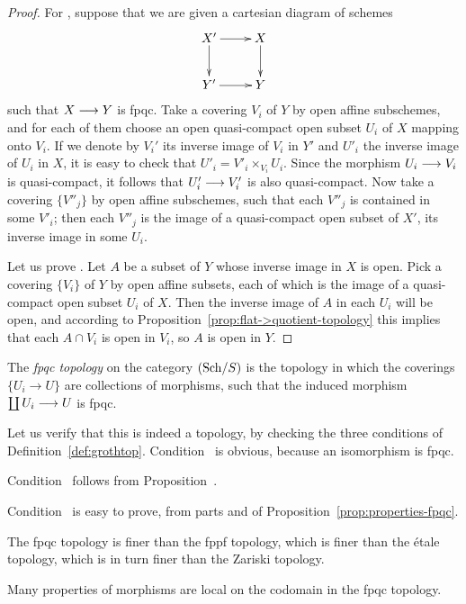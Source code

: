 \begin{2   CONTRAVARIANT FUNCTORS}
\begin{2.3 Sheaves in Grothendieck topologies}
\begin{proof}
For , suppose that we are given a cartesian diagram of schemes
   \[
   \xymatrix{
   X' \ar[r]\ar[d] & X \ar[d] \\
   Y' \ar[r] & Y
   }
   \]
such that $X \arr Y$ is fpqc. Take a covering $V_i$ of $Y$ by open affine subschemes, and for each of them choose an open quasi-compact open subset $U_i$ of $X$ mapping onto $V_i$. If we denote by $V_i'$ its inverse image of $V_i$ in $Y'$ and $U'_i$ the inverse image of $U_i$ in $X$, it is easy to check that $U'_i = V'_i \times_{V_i} U_i$. Since the morphism $U_i \arr V_i$ is quasi-compact, it follows that $U'_i \arr V'_i$ is also quasi-compact. Now take a covering $\{V''_j\}$ by open affine subschemes, such that each $V''_j$ is contained in some $V'_i$; then each $V''_j$ is the image of a quasi-compact open subset of $X'$, its inverse image in some $U_i$.

Let us prove . Let $A$ be a subset of $Y$ whose inverse image in $X$ is open. Pick a covering $\{V_i\}$ of $Y$ by open affine subsets, each of which is the image of a quasi-compact open subset $U_i$ of $X$. Then the inverse image of $A$ in each $U_i$ will be open, and according to Proposition~\ref{prop:flat->quotient-topology} this implies that each $A \cap V_i$ is open in $V_i$, so $A$ is open in $Y$.
\end{proof}




The \emph{fpqc topology}%
%
 on the category $({\mathrm{Sch}/S})$ is the topology in which the coverings $\{U_i \to U\}$ are collections of morphisms, such that the induced morphism $\coprod U_i \arr U$ is fpqc.

Let us verify that this is indeed a topology, by checking the three conditions of Definition~\ref{def:grothtop}. Condition~ is obvious, because an isomorphism is fpqc.

Condition~ follows from Proposition~.

Condition~ is easy to prove, from parts
 and  of Proposition~\ref{prop:properties-fpqc}.

The fpqc topology is finer than the fppf topology, which is finer than the \'etale topology, which is in turn finer than the Zariski topology.

Many properties of morphisms are local on the codomain in the fpqc topology.


\end{2.3 Sheaves in Grothendieck topologies}
\end{2   CONTRAVARIANT FUNCTORS}
